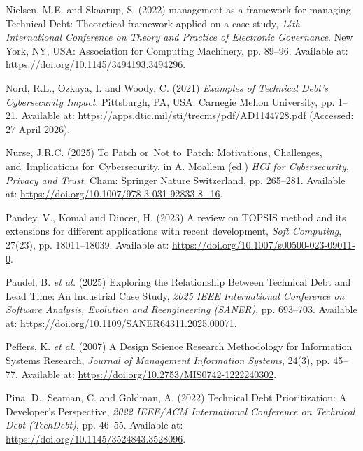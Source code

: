 \documentclass[
  12pt,
  letterpaper,
  12pt,
  oneside,
  english,
  onehalfspacing,
  headsepline]{MastersDoctoralThesis}
\newlength{\cslhangindent}
\newenvironment{CSLReferences}[2] %
 {\begin{list}{}{%
  \setlength{\itemindent}{0pt}
  \setlength{\leftmargin}{0pt}
  \setlength{\parsep}{0pt}
  \ifodd #1
   \setlength{\leftmargin}{\cslhangindent}
   \setlength{\itemindent}{-1\cslhangindent}
  \fi
  \setlength{\itemsep}{#2\baselineskip}}}
 {\end{list}}
\begin{document}
\begin{CSLReferences}{0}{1}
Nielsen, M.E. and Skaarup, S. (2022) 
management as a framework for managing {Technical Debt}: {Theoretical}
framework applied on a case study\textquotesingle, \emph{14th
{International Conference} on {Theory} and {Practice} of {Electronic
Governance}}. New York, NY, USA: Association for Computing Machinery,
pp. 89--96. Available at: \url{https://doi.org/10.1145/3494193.3494296}.

Nord, R.L., Ozkaya, I. and Woody, C. (2021) \emph{Examples of {Technical
Debt}'s {Cybersecurity Impact}}. Pittsburgh, PA, USA: Carnegie Mellon
University, pp. 1--21. Available at:
\url{https://apps.dtic.mil/sti/trecms/pdf/AD1144728.pdf} (Accessed: 27
April 2026).

Nurse, J.R.C. (2025) \textquotesingle To {Patch} or~{Not} to~{Patch}:
{Motivations}, {Challenges}, and~{Implications}
for~{Cybersecurity}\textquotesingle, in A. Moallem (ed.) \emph{{HCI} for
{Cybersecurity}, {Privacy} and {Trust}}. Cham: Springer Nature
Switzerland, pp. 265--281. Available at:
\url{https://doi.org/10.1007/978-3-031-92833-8_16}.

Pandey, V., Komal and Dincer, H. (2023) \textquotesingle A review on
{TOPSIS} method and its extensions for different applications with
recent development\textquotesingle, \emph{Soft Computing}, 27(23), pp.
18011--18039. Available at:
\url{https://doi.org/10.1007/s00500-023-09011-0}.

Paudel, B. \emph{et al.} (2025) \textquotesingle Exploring the
{Relationship Between Technical Debt} and {Lead Time}: {An Industrial
Case Study}\textquotesingle, \emph{2025 {IEEE International Conference}
on {Software Analysis}, {Evolution} and {Reengineering} ({SANER})}, pp.
693--703. Available at:
\url{https://doi.org/10.1109/SANER64311.2025.00071}.

Peffers, K. \emph{et al.} (2007) \textquotesingle A {Design Science
Research Methodology} for {Information Systems
Research}\textquotesingle, \emph{Journal of Management Information
Systems}, 24(3), pp. 45--77. Available at:
\url{https://doi.org/10.2753/MIS0742-1222240302}.

Pina, D., Seaman, C. and Goldman, A. (2022) \textquotesingle Technical
{Debt Prioritization}: {A Developer}'s {Perspective}\textquotesingle,
\emph{2022 {IEEE}/{ACM International Conference} on {Technical Debt}
({TechDebt})}, pp. 46--55. Available at:
\url{https://doi.org/10.1145/3524843.3528096}.


\end{CSLReferences}
\end{document}
